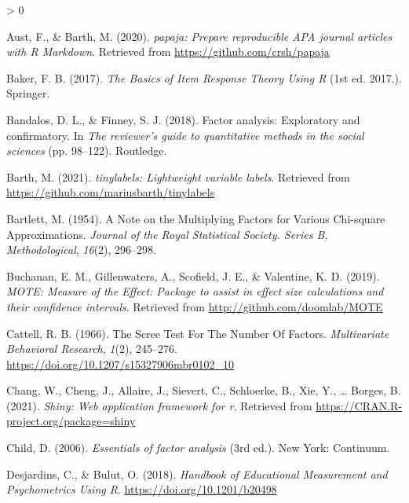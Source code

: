 \documentclass[
  english,
  man]{apa6}
\newlength{\cslhangindent}
\newenvironment{CSLReferences}[2] %
 {%
  \setlength{\parindent}{0pt}
  \ifodd #1 \everypar{\setlength{\hangindent}{\cslhangindent}}\ignorespaces\fi
  \ifnum #2 > 0
  \setlength{\parskip}{#2\baselineskip}
  \fi
 }%
 {}
\begin{document}
\hypertarget{refs}{}
\begin{CSLReferences}{1}{0}
\leavevmode\hypertarget{ref-R-papaja}{}%
Aust, F., \& Barth, M. (2020). \emph{{papaja}: {Prepare} reproducible {APA} journal articles with {R Markdown}}. Retrieved from \url{https://github.com/crsh/papaja}

\leavevmode\hypertarget{ref-bakerBasicsItemResponse2017}{}%
Baker, F. B. (2017). \emph{The {Basics} of {Item Response Theory Using R}} (1st ed. 2017.). {Springer}.

\leavevmode\hypertarget{ref-bandalosFactorAnalysisExploratory2018}{}%
Bandalos, D. L., \& Finney, S. J. (2018). Factor analysis: {Exploratory} and confirmatory. In \emph{The reviewer's guide to quantitative methods in the social sciences} (pp. 98--122). {Routledge}.

\leavevmode\hypertarget{ref-R-tinylabels}{}%
Barth, M. (2021). \emph{{tinylabels}: Lightweight variable labels}. Retrieved from \url{https://github.com/mariusbarth/tinylabels}

\leavevmode\hypertarget{ref-bartlettNoteMultiplyingFactors1954}{}%
Bartlett, M. (1954). A {Note} on the {Multiplying Factors} for {Various Chi}-square {Approximations}. \emph{Journal of the Royal Statistical Society. Series B, Methodological}, \emph{16}(2), 296--298.

\leavevmode\hypertarget{ref-R-MOTE}{}%
Buchanan, E. M., Gillenwaters, A., Scofield, J. E., \& Valentine, K. D. (2019). \emph{{MOTE: Measure of the Effect}: Package to assist in effect size calculations and their confidence intervals}. Retrieved from \url{http://github.com/doomlab/MOTE}

\leavevmode\hypertarget{ref-cattellScreeTestNumber1966}{}%
Cattell, R. B. (1966). The {Scree Test For The Number Of Factors}. \emph{Multivariate Behavioral Research}, \emph{1}(2), 245--276. \url{https://doi.org/10.1207/s15327906mbr0102_10}

\leavevmode\hypertarget{ref-R-shiny}{}%
Chang, W., Cheng, J., Allaire, J., Sievert, C., Schloerke, B., Xie, Y., \ldots{} Borges, B. (2021). \emph{Shiny: Web application framework for r}. Retrieved from \url{https://CRAN.R-project.org/package=shiny}

\leavevmode\hypertarget{ref-childEssentialsFactorAnalysis2006}{}%
Child, D. (2006). \emph{Essentials of factor analysis} (3rd ed.). {New York: Continuum}.

\leavevmode\hypertarget{ref-desjardinsHandbookEducationalMeasurement2018}{}%
Desjardins, C., \& Bulut, O. (2018). \emph{Handbook of {Educational Measurement} and {Psychometrics Using R}}. \url{https://doi.org/10.1201/b20498}


\end{CSLReferences}
\end{document}
